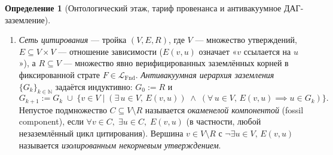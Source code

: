 \documentclass[11pt]{article}
\theoremstyle{plain}
\theoremstyle{definition}
\newtheorem{definition}[theorem]{Определение}
\newcommand{\LFnd}{\mathcal{L}_{\mathrm{Fnd}}}
\begin{document}
\begin{definition}[Онтологический этаж, тариф провенанса и антивакуумное ДАГ-заземление]
\begin{enumerate}[nosep,label=(\roman*)]
\item \emph{Сеть цитирования} --- тройка $(V, E, R)$, где $V$ --- множество утверждений, $E \subseteq V \times V$ --- отношение зависимости ($E(v, u)$ означает «$v$ ссылается на $u$»), а $R \subseteq V$ --- множество явно верифицированных заземлённых корней в фиксированной страте $F \in \LFnd$. \emph{Антивакуумная иерархия заземления} $\{G_k\}_{k \in \mathbb{N}}$ задаётся индуктивно: $G_0 := R$ и
\[
G_{k+1} := G_k \;\cup\; \bigl\{ v \in V \;\big|\; (\exists\, u \in V,\, E(v, u)) \;\wedge\; (\forall\, u \in V,\, E(v, u) \implies u \in G_k) \bigr\}.
\]
Непустое подмножество $C \subseteq V \setminus R$ называется \emph{окаменелой компонентой} (fossil component), если $\forall v \in C,\; \exists u \in C,\; E(v, u)$ (в частности, любой незаземлённый цикл цитирования). Вершина $v \in V \setminus R$ с $\neg\exists u \in V,\, E(v, u)$ называется \emph{изолированным некорневым утверждением}.
\end{enumerate}
\end{definition}
\end{document}
